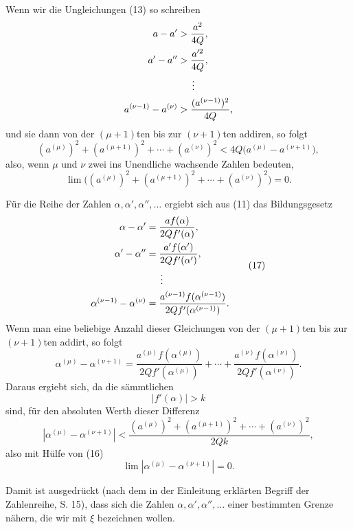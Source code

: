 
Wenn wir die Ungleichungen (13) so schreiben
\[
\begin{aligned}
 a-a'&>\frac{a^2}{4Q},\\
 a'-a''&>\frac{a'^2}{4Q},\\
 &\hspace{1.5em}\vdots\\
 a^{(\nu-1)}-a^{(\nu)}&>\frac{(a^{(\nu-1)})^2}{4Q},
\end{aligned}
\]
und sie dann von der $(\mu+1)$ten bis zur $(\nu+1)$ten addiren, so folgt
\[
 (a^{(\mu)})^2+(a^{(\mu+1)})^2+\cdots+(a^{(\nu)})^2
 <4Q\bigl(a^{(\mu)}-a^{(\nu+1)}\bigr),
\]
also, wenn $\mu$ und $\nu$ zwei ins Unendliche wachsende Zahlen bedeuten,
\begin{equation}
 \lim\bigl((a^{(\mu)})^2+(a^{(\mu+1)})^2+\cdots+(a^{(\nu)})^2\bigr)=0.
\tag{16}
\end{equation}

Für die Reihe der Zahlen $\alpha,\alpha',\alpha'',\ldots$ ergiebt sich aus (11) das Bildungsgesetz
\begin{equation}
\begin{aligned}
 \alpha-\alpha'&=\frac{a f(\alpha)}{2Q f'(\alpha)},\\
 \alpha'-\alpha''&=\frac{a' f(\alpha')}{2Q f'(\alpha')},\\
 &\hspace{1.5em}\vdots\\
 \alpha^{(\nu-1)}-\alpha^{(\nu)}&=
 \frac{a^{(\nu-1)} f(\alpha^{(\nu-1)})}{2Q f'(\alpha^{(\nu-1)})}.
\end{aligned}
\tag{17}
\end{equation}
Wenn man eine beliebige Anzahl dieser Gleichungen von der $(\mu+1)$ten bis zur $(\nu+1)$ten addirt, so folgt
\begin{equation}
 \alpha^{(\mu)}-\alpha^{(\nu+1)}=
 \frac{a^{(\mu)}f(\alpha^{(\mu)})}{2Q f'(\alpha^{(\mu)})}+\cdots+
 \frac{a^{(\nu)}f(\alpha^{(\nu)})}{2Q f'(\alpha^{(\nu)})}.
\tag{18}
\end{equation}
Daraus ergiebt sich, da die sämmtlichen
\[
 |f'(\alpha)|>k
\]
sind, für den absoluten Werth dieser Differenz
\begin{equation}
 |\alpha^{(\mu)}-\alpha^{(\nu+1)}|<
 \frac{(a^{(\mu)})^2+(a^{(\mu+1)})^2+\cdots+(a^{(\nu)})^2}{2Qk},
\tag{19}
\end{equation}
also mit Hülfe von (16)
\begin{equation}
 \lim |\alpha^{(\mu)}-\alpha^{(\nu+1)}|=0.
\tag{20}
\end{equation}

Damit ist ausgedrückt (nach dem in der Einleitung erklärten Begriff der Zahlenreihe, S. 15), dass sich die Zahlen $\alpha,\alpha',\alpha'',\ldots$ einer bestimmten Grenze nähern, die wir mit $\xi$ bezeichnen wollen.
